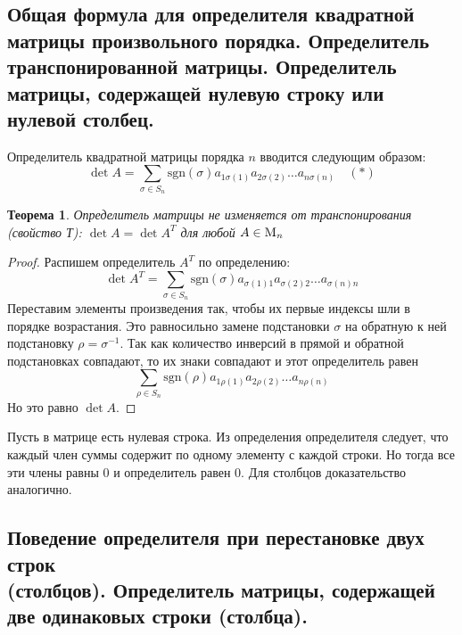 \documentclass[a4paper, 12pt]{article}
\newtheorem*{T_det}{Теорема}
\begin{document}
\subsection{Общая формула для определителя квадратной матрицы произвольного порядка. Определитель транспонированной матрицы. Определитель матрицы, содержащей нулевую строку или нулевой столбец.}
Определитель квадратной матрицы порядка $n$ вводится следующим образом:
\[\det{A} = \sum_{\sigma \in S_n} \text{sgn}(\sigma)a_{1\sigma(1)}a_{2\sigma(2)}\ldots a_{n\sigma(n)} \quad (*)\]
\begin{T_det}
Определитель матрицы не изменяется от транспонирования (свойство Т): $\det A = \det A^T$ для любой $A \in \textsc{M}_{n}$ 
\end{T_det}
\begin{proof}
Распишем определитель $A^T$ по определению:
\[\det{A^T} = \sum_{\sigma \in S_n} \text{sgn}(\sigma)a_{\sigma(1)1}a_{\sigma(2)2}\ldots a_{\sigma(n)n}\]
Переставим элементы произведения так, чтобы их первые индексы шли в порядке возрастания. Это равносильно замене подстановки $\sigma$ на обратную к ней подстановку $\rho = \sigma^{-1}$. Так как количество инверсий в прямой и обратной подстановках совпадают, то их знаки совпадают и этот определитель равен
\[\sum_{\rho \in S_n} \text{sgn}(\rho)a_{1\rho(1)}a_{2\rho(2)}\ldots a_{n\rho(n)}\]
Но это равно $\det{A}$.
\end{proof}

Пусть в матрице есть нулевая строка. Из определения определителя следует, что каждый член суммы содержит по одному элементу с каждой строки. Но тогда все эти члены равны 0 и определитель равен 0. Для столбцов доказательство аналогично.

\subsection{Поведение определителя при перестановке двух строк \\(столбцов). Определитель матрицы, содержащей две одинаковых строки (столбца).}
\end{document}
